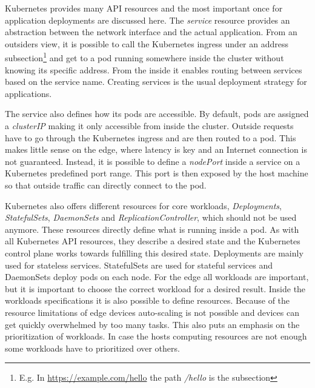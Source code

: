Kubernetes provides many API resources and the most important once for application deployments are discussed here.
The \textit{service} resource provides an abstraction between the network interface and the actual application. From an outsiders view, it is possible to call the Kubernetes ingress under an address subsection\footnote{E.g. In \url{https://example.com/hello} the path \textit{/hello} is the subsection} and get to a pod running somewhere inside the cluster without knowing its specific address. From the inside it enables routing between services based on the service name. Creating services is the usual deployment strategy for applications.

The service also defines how its pods are accessible. By default, pods are assigned a \textit{clusterIP} making it only accessible from inside the cluster. Outside requests have to go through the Kubernetes ingress and are then routed to a pod. This makes little sense on the edge, where latency is key and an Internet connection is not guaranteed. Instead, it is possible to define a \textit{nodePort} inside a service on a Kubernetes predefined port range. This port is then exposed by the host machine so that outside traffic can directly connect to the pod.

Kubernetes also offers different resources for core workloads, \textit{Deployments},  \textit{StatefulSets},  \textit{DaemonSets} and  \textit{ReplicationController}, which should not be used anymore\cite{CoreWorkloadKubernetes66:online}. These resources directly define what is running inside a pod. As with all Kubernetes API resources, they describe a desired state and the Kubernetes control plane works towards fulfilling this desired state. Deployments are mainly used for stateless services. StatefulSets are used for stateful services and DaemonSets deploy pods on each node. For the edge all workloads are important, but it is important to choose the correct workload for a desired result. Inside the workloads specifications it is also possible to define resources. Because of the resource limitations of edge devices auto-scaling is not possible and devices can get quickly overwhelmed by too many tasks. This also puts an emphasis on the prioritization of workloads. In case the hosts computing resources are not enough some workloads have to prioritized over others. 

